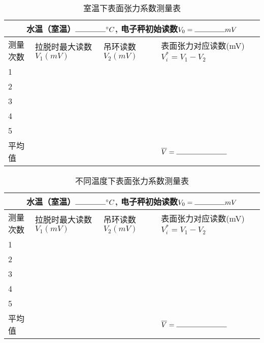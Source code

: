 \documentclass{ctexart}
\begin{document}
\begin{table}[h]
    \renewcommand\arraystretch{1.6}
    \centering
    \caption{室温下表面张力系数测量表}
    \label{tab:T1}
    \begin{tabular}{|m{1.8cm}<{\centering}|m{3cm}<{\centering}|m{2.5cm}<{\centering}|m{4cm}<{\centering}|}
        \multicolumn{4}{c}{水温（室温）$\rule{1.5cm}{0.4pt} ^\circ C$,  电子秤初始读数$V_0 = \rule{1.5cm}{0.4pt} mV$} \\
        \hline
        测量次数& 拉脱时最大读数 $V_1 (mV)$ & 吊环读数 $V_2 (mV)$ & 表面张力对应读数(mV) $V_i^\ast = V_1-V_2$\\
        \hline
        1 & & & \\
        \hline
        2 & & & \\
        \hline
        3 & & & \\
        \hline
        4 & & & \\
        \hline
        5 & & & \\
        \hline
        平均值 & & & $\overline{V} = \rule{2.5cm}{0.4pt} $\\
        \hline
    \end{tabular}
\end{table}

\begin{table}[!h]
    \renewcommand\arraystretch{1.6}
    \centering
    \caption{不同温度下表面张力系数测量表}
    \label{tab:T2}
    \begin{tabular}{|m{1.8cm}<{\centering}|m{3cm}<{\centering}|m{2.5cm}<{\centering}|m{4cm}<{\centering}|}
        \multicolumn{4}{c}{水温（室温）$\rule{1.5cm}{0.4pt} ^\circ C$,  电子秤初始读数$V_0 = \rule{1.5cm}{0.4pt} mV$} \\
        \hline
        测量次数& 拉脱时最大读数 $V_1 (mV)$ & 吊环读数 $V_2 (mV)$ & 表面张力对应读数(mV) $V_i^\ast = V_1-V_2$\\
        \hline
        1 & & & \\
        \hline
        2 & & & \\
        \hline
        3 & & & \\
        \hline
        4 & & & \\
        \hline
        5 & & & \\
        \hline
        平均值 & & & $\overline{V} = \rule{2.5cm}{0.4pt} $\\
        \hline
    \end{tabular}
\end{table}

\end{document}
